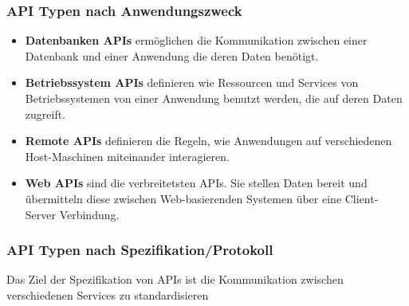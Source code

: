 \subsubsection{API Typen nach Anwendungszweck} %
\label{sec:apitypenanwendungszweck}
\begin{itemize}
\item \textbf{Datenbanken APIs} ermöglichen die Kommunikation zwischen einer Datenbank und einer Anwendung die deren Daten benötigt. \citep{TUM}

\item \textbf{Betriebssystem APIs} definieren wie Ressourcen und Services von Betriebssystemen von einer Anwendung benutzt werden, die auf deren Daten zugreift. \citep{TUM}

\item \textbf{Remote APIs} definieren die Regeln, wie Anwendungen auf verschiedenen Host-Maschinen miteinander interagieren. \citep{TUM}

\item \textbf{Web APIs} sind die verbreitetsten APIs. Sie stellen Daten bereit und übermitteln diese zwischen Web-basierenden Systemen über eine Client-Server Verbindung. \citep{TUM}

\end{itemize}

\subsubsection{API Typen nach Spezifikation/Protokoll} %
\label{sec:apitypenspezifikation}
Das Ziel der Spezifikation von APIs ist die Kommunikation zwischen verschiedenen Services zu standardisieren

